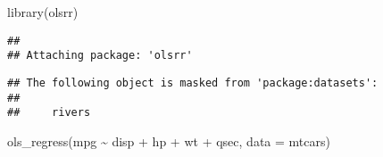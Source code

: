 \documentclass[
]{article}
\newenvironment{Shaded}{\begin{snugshade}}{\end{snugshade}}
\newcommand{\AttributeTok}[1]{\textcolor[rgb]{0.77,0.63,0.00}{#1}}
\newcommand{\FunctionTok}[1]{\textcolor[rgb]{0.00,0.00,0.00}{#1}}
\newcommand{\NormalTok}[1]{#1}
\newcommand{\SpecialCharTok}[1]{\textcolor[rgb]{0.00,0.00,0.00}{#1}}
\begin{document}
\begin{Shaded}
\begin{Highlighting}[]
\FunctionTok{library}\NormalTok{(olsrr)}
\end{Highlighting}
\end{Shaded}

\begin{verbatim}
## 
## Attaching package: 'olsrr'
\end{verbatim}

\begin{verbatim}
## The following object is masked from 'package:datasets':
## 
##     rivers
\end{verbatim}

\begin{Shaded}
\begin{Highlighting}[]
\FunctionTok{ols\_regress}\NormalTok{(mpg }\SpecialCharTok{\textasciitilde{}}\NormalTok{ disp }\SpecialCharTok{+}\NormalTok{ hp }\SpecialCharTok{+}\NormalTok{ wt }\SpecialCharTok{+}\NormalTok{ qsec, }\AttributeTok{data =}\NormalTok{ mtcars)}
\end{Highlighting}
\end{Shaded}
\end{document}
